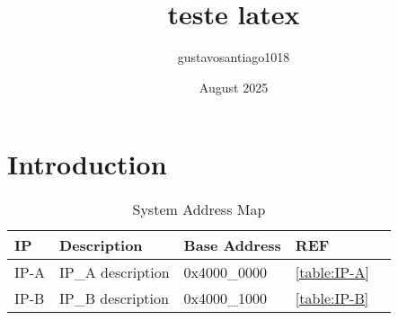 \documentclass{article}
\title{teste latex}
\author{gustavosantiago1018 }
\date{August 2025}
\begin{document}
\maketitle

\section{Introduction}


\begin{table}[h]
\centering
\caption{System Address Map}
\label{table:system_address_map}
\begin{tabular}{|l|l|l|l|l|}
\hline
\textbf{IP} & \textbf{Description} & \textbf{Base Address} & \textbf{REF} \\ \hline
IP-A & IP\_A description & 0x4000\_0000  & \ref{table:IP-A} \\ \hline
IP-B & IP\_B description & 0x4000\_1000  & \ref{table:IP-B} \\ \hline
\end{tabular}
\end{table}
\end{document}
